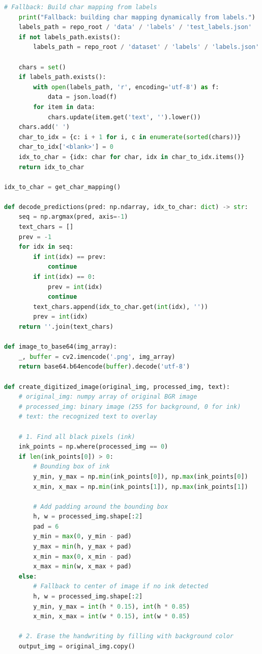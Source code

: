 \begin{lstlisting}[language=Python, style=pythoncode, caption={app.py Implementation}]
    # Fallback: Build char mapping from labels
    print("Fallback: building char mapping dynamically from labels.")
    labels_path = repo_root / 'data' / 'labels' / 'test_labels.json'
    if not labels_path.exists():
        labels_path = repo_root / 'dataset' / 'labels' / 'labels.json'
        
    chars = set()
    if labels_path.exists():
        with open(labels_path, 'r', encoding='utf-8') as f:
            data = json.load(f)
        for item in data:
            chars.update(item.get('text', '').lower())
    chars.add(' ')
    char_to_idx = {c: i + 1 for i, c in enumerate(sorted(chars))}
    char_to_idx['<blank>'] = 0
    idx_to_char = {idx: char for char, idx in char_to_idx.items()}
    return idx_to_char

idx_to_char = get_char_mapping()

def decode_predictions(pred: np.ndarray, idx_to_char: dict) -> str:
    seq = np.argmax(pred, axis=-1)
    text_chars = []
    prev = -1
    for idx in seq:
        if int(idx) == prev:
            continue
        if int(idx) == 0:
            prev = int(idx)
            continue
        text_chars.append(idx_to_char.get(int(idx), ''))
        prev = int(idx)
    return ''.join(text_chars)

def image_to_base64(img_array):
    _, buffer = cv2.imencode('.png', img_array)
    return base64.b64encode(buffer).decode('utf-8')

def create_digitized_image(original_img, processed_img, text):
    # original_img: numpy array of original BGR image
    # processed_img: binary image (255 for background, 0 for ink)
    # text: the recognized text to overlay
    
    # 1. Find all black pixels (ink)
    ink_points = np.where(processed_img == 0)
    if len(ink_points[0]) > 0:
        # Bounding box of ink
        y_min, y_max = np.min(ink_points[0]), np.max(ink_points[0])
        x_min, x_max = np.min(ink_points[1]), np.max(ink_points[1])
        
        # Add padding around the bounding box
        h, w = processed_img.shape[:2]
        pad = 6
        y_min = max(0, y_min - pad)
        y_max = min(h, y_max + pad)
        x_min = max(0, x_min - pad)
        x_max = min(w, x_max + pad)
    else:
        # Fallback to center of image if no ink detected
        h, w = processed_img.shape[:2]
        y_min, y_max = int(h * 0.15), int(h * 0.85)
        x_min, x_max = int(w * 0.15), int(w * 0.85)
        
    # 2. Erase the handwriting by filling with background color
    output_img = original_img.copy()
    

\end{lstlisting}

